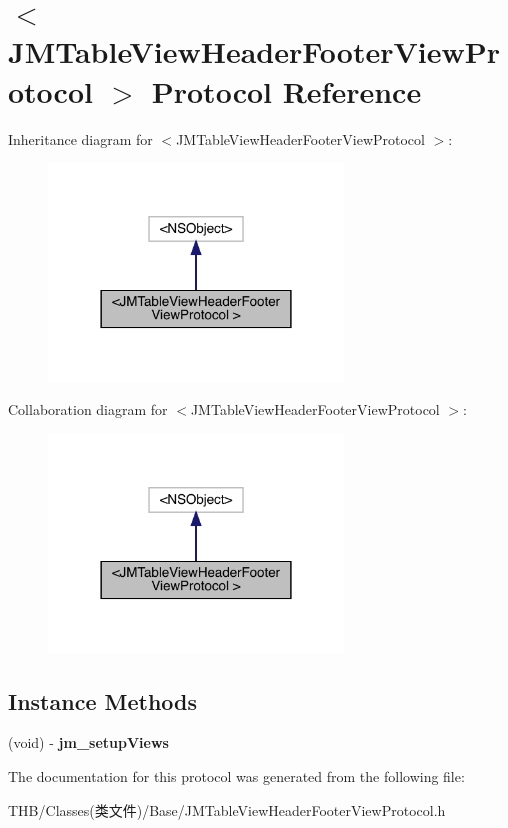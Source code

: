 \hypertarget{protocol_j_m_table_view_header_footer_view_protocol_01-p}{}\section{$<$J\+M\+Table\+View\+Header\+Footer\+View\+Protocol $>$ Protocol Reference}
\label{protocol_j_m_table_view_header_footer_view_protocol_01-p}


Inheritance diagram for $<$J\+M\+Table\+View\+Header\+Footer\+View\+Protocol $>$\+:\nopagebreak
\begin{figure}[H]
\begin{center}
\leavevmode
\includegraphics[width=222pt]{protocol_j_m_table_view_header_footer_view_protocol_01-p__inherit__graph}
\end{center}
\end{figure}


Collaboration diagram for $<$J\+M\+Table\+View\+Header\+Footer\+View\+Protocol $>$\+:\nopagebreak
\begin{figure}[H]
\begin{center}
\leavevmode
\includegraphics[width=222pt]{protocol_j_m_table_view_header_footer_view_protocol_01-p__coll__graph}
\end{center}
\end{figure}
\subsection*{Instance Methods}
\begin{DoxyCompactItemize}
\item 
\mbox{\label{protocol_j_m_table_view_header_footer_view_protocol_01-p_ada74b14c9c47d4a5a39448ef83865d43}} 
(void) -\/ {\bfseries jm\+\_\+setup\+Views}
\end{DoxyCompactItemize}


The documentation for this protocol was generated from the following file\+:\begin{DoxyCompactItemize}
\item 
T\+H\+B/\+Classes(类文件)/\+Base/J\+M\+Table\+View\+Header\+Footer\+View\+Protocol.\+h\end{DoxyCompactItemize}
